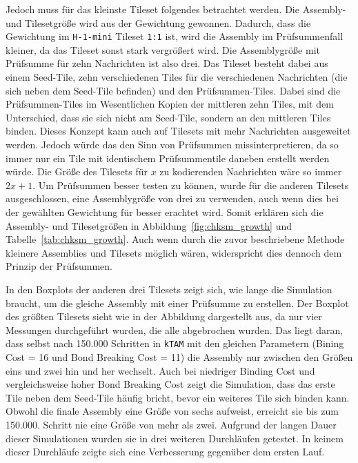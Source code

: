 Jedoch muss für das kleinste Tileset folgendes betrachtet werden. Die Assembly- und Tilesetgröße wird aus der Gewichtung gewonnen. Dadurch, dass die Gewichtung im \texttt{H-1-mini} Tileset \texttt{1:1} ist, wird die Assembly im Prüfsummenfall kleiner, da das Tileset sonst stark vergrößert wird. Die Assemblygröße mit Prüfsumme für zehn Nachrichten ist also drei. Das Tileset besteht dabei aus einem Seed-Tile, zehn verschiedenen Tiles für die verschiedenen Nachrichten (die sich neben dem Seed-Tile befinden) und den Prüfsummen-Tiles. Dabei sind die Prüfsummen-Tiles im Wesentlichen Kopien der mittleren zehn Tiles, mit dem Unterschied, dass sie sich nicht am Seed-Tile, sondern an den mittleren Tiles binden. Dieses Konzept kann auch auf Tilesets mit mehr Nachrichten ausgeweitet werden. Jedoch würde das den Sinn von Prüfsummen missinterpretieren, da so immer nur ein Tile mit identischem Prüfsummentile daneben erstellt werden würde. Die Größe des Tilesets für $x$ zu kodierenden Nachrichten wäre so immer $2x+1$. Um Prüfsummen besser testen zu können, wurde für die anderen Tilesets ausgeschlossen, eine Assemblygröße von drei zu verwenden, auch wenn dies bei der gewählten Gewichtung für besser erachtet wird. Somit erklären sich die Assembly- und Tilesetgrößen in Abbildung~\ref{fig:chksm_growth} und Tabelle~\ref{tab:chksm_growth}. Auch wenn durch die zuvor beschriebene Methode kleinere Assemblies und Tilesets möglich wären, widerspricht dies dennoch dem Prinzip der Prüfsummen.

In den Boxplots der anderen drei Tilesets zeigt sich, wie lange die Simulation braucht, um die gleiche Assembly mit einer Prüfsumme zu erstellen. Der Boxplot des größten Tilesets sieht wie in der Abbildung dargestellt aus, da nur vier Messungen durchgeführt wurden, die alle abgebrochen wurden. Das liegt daran, dass selbst nach 150.000 Schritten in \texttt{kTAM} mit den gleichen Parametern (Bining Cost = 16 und Bond Breaking Cost = 11) die Assembly nur zwischen den Größen eins und zwei hin und her wechselt. Auch bei niedriger Binding Cost und vergleichsweise hoher Bond Breaking Cost zeigt die Simulation, dass das erste Tile neben dem Seed-Tile häufig bricht, bevor ein weiteres Tile sich binden kann. Obwohl die finale Assembly eine Größe von sechs aufweist, erreicht sie bis zum 150.000. Schritt nie eine Größe von mehr als zwei. Aufgrund der langen Dauer dieser Simulationen wurden sie in drei weiteren Durchläufen getestet. In keinem dieser Durchläufe zeigte sich eine Verbesserung gegenüber dem ersten Lauf.

